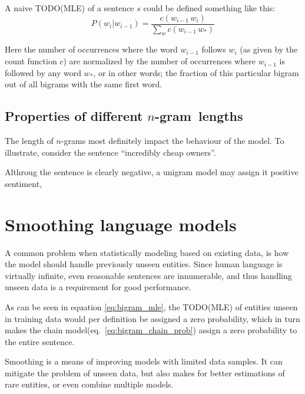 \documentclass[a4paper,11pt]{kth-mag}
\newcommand{\ngram}{$n$-gram}
\newcommand{\gls}[1]{TODO(#1)}
\begin{document}
A naive \gls{MLE} of a sentence $s$ could be defined something like this:
\begin{equation} \label{eq:bigram_mle}
P(w_i|w_{i-1}) = \frac{c(w_{i-1}\,w_i)}{\sum_{w} c(w_{i-1}\, w_*)}
\end{equation}

Here the number of occurrences where the word $w_{i-1}$ follows $w_i$
(as given by the count function $c$) are normalized by the number of occurrences where $w_{i-1}$
is followed by any word $w_*$, or in other words; the fraction of this particular bigram
out of all bigrams with the same first word.

%




\subsection{Properties of different \ngram~lengths}

The length of \ngram s most definitely impact the behaviour of the model.
To illustrate, consider the sentence ``incredibly cheap owners''.

Althroug the sentence is clearly negative, a unigram model may assign it positive sentiment,

\section{Smoothing language models}
A common problem when statistically modeling based on existing data,
is how the model should handle previously unseen entities.
Since human language is virtually infinite, even reasonable sentences are innumerable,
and thus handling unseen data is a requirement for good performance.

As can be seen in equation \ref{eq:bigram_mle}, the \gls{MLE} of entities unseen in
training data would per definition be assigned a zero probability, which in turn makes
the chain model(eq.~\ref{eq:bigram_chain_prob}) assign a zero probability to the entire
sentence\cite{chen_goodman}.

Smoothing is a means of improving models with limited data samples.
It can mitigate the problem of unseen data,
but also makes for better estimations of rare entities, or even combine multiple models.
\end{document}
